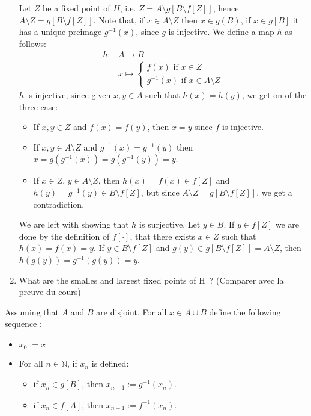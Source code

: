 \documentclass[a4paper,11pt]{exam}
\newcommand{\N}{\mathbb{N}}
\begin{document}
\begin{questions}
\begin{enumerate}
			\begin{solution}
				Let $Z$ be a fixed point of $H$, i.e. $Z = A \setminus g[B \setminus f[Z]]$, hence $A \setminus Z = g[B \setminus f[Z]]$.
				Note that, if $x\in A\setminus Z$ then $x\in g(B)$, if $x \in g[B]$ it has a unique preimage $g^{-1}(x)$, since $g$ is injective.				
				We define a map $h$ as follows:
				\begin{align*}
				h : & A \to B\\
				& x \mapsto
				\begin{cases}
				f(x) \mbox{ if }x \in Z\\
				g^{-1}(x) \mbox{ if } x \in A \setminus Z
				\end{cases}
				\end{align*}
				$h$ is injective, since given $x,y \in A$ such that
				$h(x) = h(y)$, we get on of the three case:
				\begin{itemize}
					\item If $x,y \in Z$ and $f(x) = f(y)$, then $x = y$ since $f$ is injective.
					\item If $x,y \in A \setminus Z$ and $g^{-1}(x) = g^{-1}(y)$ then 
					$x = g(g^{-1}(x)) = g(g^{-1}(y)) = y$.
					\item If $x \in Z$, $y \in A \setminus Z$, then
					$h(x) = f(x) \in f[Z]$ and $h(y) = g^{-1}(y) \in B \setminus f[Z]$, but since $A \setminus Z = g[B \setminus f[Z]]$, we get a contradiction.
				\end{itemize}
				We are left with showing that $h$ is surjective. Let $y \in B$. If $y \in f[Z]$ we are done by the definition of $f[\cdot]$, that there exists $x \in Z$ such that
				$h(x) = f(x) = y$.
				If $y \in B \setminus f[Z]$ and $g(y) \in g[B \setminus f[Z]] = A\setminus Z$, then $h(g(y)) = g^{-1}(g(y)) = y$.
			\end{solution}
			
			\item What are the smalles and largest fixed points of H~?
			(Comparer avec la preuve du cours)
		\end{enumerate}
		
		\begin{solution}
			
			Assuming that $A$ and $B$ are disjoint.  For all $x\in A\cup B$ define the following sequence :
			\begin{itemize}
				\item $x_0 := x$
				\item For all $n \in \N$, if $x_{n}$ is defined:
				\begin{itemize}
					\item if  $x_n\in g[B]$, then $x_{n+1} := g^{-1}(x_{n})$.
					\item if $x_n\in f[A]$, then $x_{n+1} := f^{-1}(x_{n})$.
				\end{itemize}
			\end{itemize}
			

\end{solution}
\end{questions}
\end{document}
